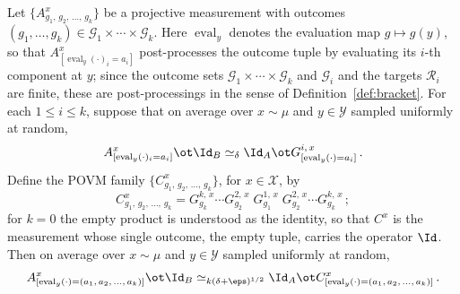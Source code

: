 \begin{lemma}
	Let $\bigl\{ A^x_{g_1,\,g_2,\,\dots,\,g_k} \bigr\}$ be a projective measurement with outcomes $(g_1,\dots,g_k) \in \mathcal G_1 \times \cdots \times \mathcal G_k$. Here $\operatorname{eval}_y$ denotes the evaluation map $g \mapsto g(y)$, so that $A^x_{[\operatorname{eval}_y(\cdot)_i = a_i]}$ post-processes the outcome tuple by evaluating its $i$-th component at $y$; since the outcome sets $\mathcal G_1 \times \cdots \times \mathcal G_k$ and $\mathcal G_i$ and the targets $\mathcal R_i$ are finite, these are post-processings in the sense of Definition~\ref{def:bracket}. For each $1 \le i \le k$, suppose that on average over $x \sim \mu$ and $y \in \mathcal Y$ sampled uniformly at random,
	\begin{equation}\label{eq:ld-sandwich-1}
		A^x_{[\operatorname{eval}_y(\cdot)_i = a_i]} \ot \Id_B \simeq_{\delta} \Id_A \ot G^{i,\,x}_{[\operatorname{eval}_y(\cdot) = a_i]}\,.
	\end{equation}
	Define the POVM family $\{C^x_{g_1,\,g_2,\,\dots,\,g_k}\}$, for $x \in \mathcal X$, by
	\[
		C^x_{g_1,\,g_2,\,\dots,\,g_k} = G^{k,\,x}_{g_k} \cdots G^{2,\,x}_{g_2}\; G^{1,\,x}_{g_1}\; G^{2,\,x}_{g_2} \cdots G^{k,\,x}_{g_k}\,;
	\]
	for $k = 0$ the empty product is understood as the identity, so that $C^x$ is the measurement whose single outcome, the empty tuple, carries the operator $\Id$. Then on average over $x \sim \mu$ and $y \in \mathcal Y$ sampled uniformly at random,
	\begin{equation}\label{eq:ld-sandwich-2}
		A^x_{[\operatorname{eval}_y(\cdot) = (a_1,\,a_2,\,\dots,\,a_k)]} \ot \Id_B \simeq_{k(\delta+\eps)^{1/2}} \Id_A \ot C^x_{[\operatorname{eval}_y(\cdot) = (a_1,\,a_2,\,\dots,\,a_k)]}\,.
	\end{equation}
\end{lemma}
